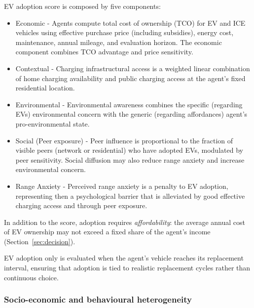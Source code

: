 \documentclass[11pt]{article}
\begin{document}
\begin{enumerate}
  EV adoption score is composed by five components:
  \begin{itemize}
  \item Economic - Agents compute total cost of ownership (TCO) for EV and
    ICE vehicles using effective purchase price (including subsidies),
    energy cost, maintenance, annual mileage, and evaluation horizon. The
    economic component combines TCO advantage and price sensitivity.
  \item Contextual - Charging infrastructural access is a weighted linear
    combination of home charging availability and public charging access at
    the agent's fixed residential location.
  \item Environmental - Environmental awareness combines the specific
    (regarding EVs) environmental concern with the generic (regarding
    affordances) agent's pro-environmental state.
  \item Social (Peer exposure) - Peer influence is proportional to the
    fraction of visible peers (network or residential) who have adopted
    EVs, modulated by peer sensitivity. Social diffusion may also reduce
    range anxiety and increase environmental concern.
  \item Range Anxiety - Perceived range anxiety is a penalty to EV
    adoption, representing then a psychological barrier that is alleviated
    by good effective charging access and through peer exposure.
  \end{itemize}

  In addition to the score, adoption requires \emph{affordability}: the
  average annual cost of EV ownership may not exceed a fixed share of the
  agent's income (Section~\ref{sec:decision}).

  EV adoption only is evaluated when the agent's vehicle reaches its
  replacement interval, ensuring that adoption is tied to realistic
  replacement cycles rather than continuous choice.
\end{enumerate}

\subsubsection{Socio-economic and behavioural heterogeneity}
\end{document}
